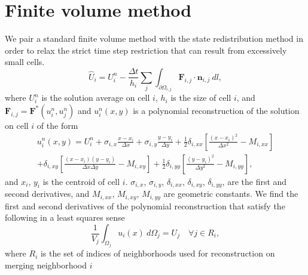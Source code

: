 
\section{Finite volume method}
We pair a standard finite volume method with the state redistribution method in order to relax the strict time step restriction that can result from excessively small cells. 
\begin{equation} 
\hat U_i = U^n_i - \frac{\Delta t}{h_i}\sum_{j} \int_{\partial \Omega_{i,j}} \mathbf{F}_{i,j} \cdot \mathbf{n}_{i,j}~dl,\label{eq:scheme}
\end{equation}
where $U^n_i$ is the solution average on cell $i$, $h_i$ is the size of cell $i$, and $\mathbf{F}_{i,j} = \mathbf{F}^*(u^n_{i},u^n_{j})$ and $u^n_{i}(x,y)$ is a polynomial reconstruction of the solution on cell $i$ of the form
\begin{equation}\label{eq:uhat}
\begin{aligned}
	    u^n_i(x,y) = U^n_{i} +  \sigma_{i,x}\frac{x- x_i}{\Delta x} +   \sigma_{i,y}\frac{y- y_i}{\Delta y} + \frac{1}{2} \delta_{i, xx}\left[ \frac{(x -  x_i)^2 }{\Delta x^2} -  M_{i,xx}\right]\\
	    + \delta_{i, xy}\left[ \frac{(x -  x_i) (y -  y_i) }{\Delta x \Delta y} -  M_{i,xy}\right] + \frac{1}{2} \delta_{i, yy}\left[ \frac{(y -  y_i)^2 }{\Delta y^2} -   M_{i,yy}\right],
\end{aligned}
\end{equation}
and $ x_i$, $ y_i$ is the centroid of cell $i$. $ \sigma_{i,x}$, $ \sigma_{i,y}$, $ \delta_{i,xx}$, $ \delta_{i,xy}$, $ \delta_{i,yy}$, are the first and second derivatives, and $  M_{i,xx}$, $ M_{i,xy}$,  $ M_{i,yy}$ are geometric constants. We find the first and second derivatives of the polynomial reconstruction that satisfy the following in a least squares sense
\begin{equation}\label{eq:qi}
\frac{1}{ V_j}\int_{\Omega_j} u_i(x)~d\Omega_j = U_j \quad \forall j \in R_i,
\end{equation}
where $R_i$ is the set of indices of neighborhoods used for reconstruction on merging neighborhood $i$

